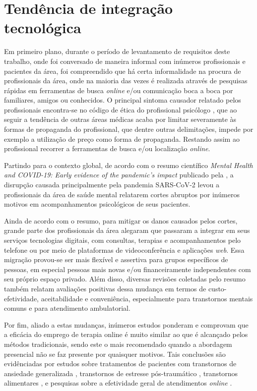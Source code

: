 \section{Tendência de integração tecnológica}
\label{sec:tendenciaDeIntegracaoTecnologica}

Em primeiro plano, durante o período de levantamento de requisitos deste trabalho, onde foi conversado de maneira informal com inúmeros profissionais e pacientes da área, foi compreendido que há certa informalidade na procura de profissionais da área, onde na maioria das vezes é realizada através de pesquisas rápidas em ferramentas de busca \textit{online} e/ou comunicação boca a boca por familiares, amigos ou conhecidos. O principal sintoma causador relatado pelos profissionais encontra-se no código de ética do profissional psicólogo \cite{Psicologia2005}, que ao seguir a tendência de outras áreas médicas acaba por limitar severamente às formas de propaganda do profissional, que dentre outras delimitações, impede por exemplo a utilização de preço como forma de propaganda. Restando assim ao profissional recorrer a ferramentas de busca e/ou localização \textit{online}.

Partindo para o contexto global, de acordo com o resumo científico \textit{Mental Health and COVID-19: Early evidence of the pandemic’s impact} publicado pela , a disrupção causada principalmente pela pandemia SARS-CoV-2 levou a profissionais da área de saúde mental relatarem cortes abruptos por inúmeros motivos em acompanhamentos psicológicos de seus pacientes.

Ainda de acordo com o resumo, para mitigar os danos causados pelos cortes, grande parte dos profissionais da área alegaram que passaram a integrar em seus serviços tecnologias digitais, com consultas, terapias e acompanhamentos pelo telefone ou por meio de plataformas de videoconferência e aplicações \textit{web}. Essa migração provou-se ser mais flexível e assertiva para grupos específicos de pessoas, em especial pessoas mais novas e/ou financeiramente independentes com seu próprio espaço privado. Além disso, diversas revisões coletadas pelo resumo também relatam avaliações positivas dessa mudança em termos de custo-efetividade, aceitabilidade e conveniência, especialmente para transtornos mentais comuns e para atendimento ambulatorial.

Por fim, aliado a estas mudanças, inúmeros estudos ponderam e comprovam que a eficácia do emprego de terapia online é muito similar ao que é alcançado pelos métodos tradicionais, sendo este o mais recomendado quando a abordagem presencial não se faz presente por quaisquer motivos. Tais conclusões são evidênciadas por estudos sobre tratamentos de pacientes com transtornos de ansiedade generalizada \cite{Eilert2020}, transtornos de estresse pós-traumático \cite{Simblett2017}, transtornos alimentares \cite{Loucas2014}, e pesquisas sobre a efetividade geral de atendimentos \textit{online} \cite{Barak2008}.
